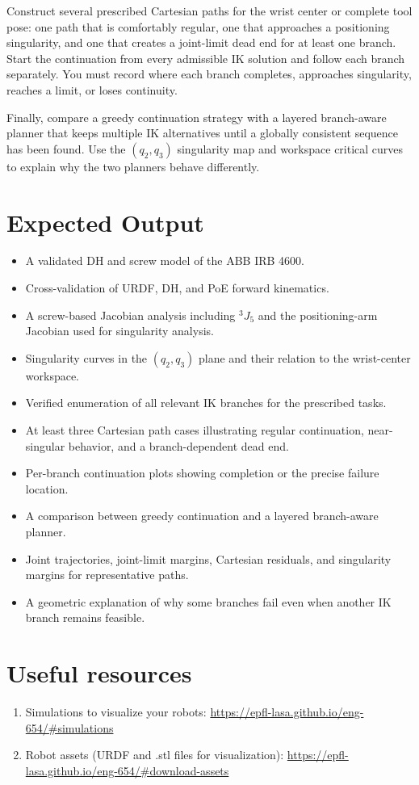 \documentclass[11pt,a4paper]{article}
\begin{document}
Construct several prescribed Cartesian paths for the wrist center or complete tool pose: one path that is comfortably regular, one that approaches a positioning singularity, and one that creates a joint-limit dead end for at least one branch. Start the continuation from every admissible IK solution and follow each branch separately. You must record where each branch completes, approaches singularity, reaches a limit, or loses continuity.

Finally, compare a greedy continuation strategy with a layered branch-aware planner that keeps multiple IK alternatives until a globally consistent sequence has been found. Use the $(q_2,q_3)$ singularity map and workspace critical curves to explain why the two planners behave differently.

\section*{Expected Output}
\begin{itemize}
  \item A validated DH and screw model of the ABB IRB 4600.
  \item Cross-validation of URDF, DH, and PoE forward kinematics.
  \item A screw-based Jacobian analysis including $^{3}J_{5}$ and the positioning-arm Jacobian used for singularity analysis.
  \item Singularity curves in the $(q_2,q_3)$ plane and their relation to the wrist-center workspace.
  \item Verified enumeration of all relevant IK branches for the prescribed tasks.
  \item At least three Cartesian path cases illustrating regular continuation, near-singular behavior, and a branch-dependent dead end.
  \item Per-branch continuation plots showing completion or the precise failure location.
  \item A comparison between greedy continuation and a layered branch-aware planner.
  \item Joint trajectories, joint-limit margins, Cartesian residuals, and singularity margins for representative paths.
  \item A geometric explanation of why some branches fail even when another IK branch remains feasible.
\end{itemize}

\section*{Useful resources}
\begin{enumerate}
	\item Simulations to visualize your robots: \url{https://epfl-lasa.github.io/eng-654/#simulations} 
	\item Robot assets (URDF and .stl files for visualization): \url{https://epfl-lasa.github.io/eng-654/#download-assets}
\end{enumerate}
\end{document}
